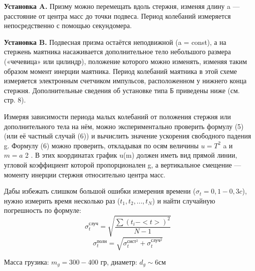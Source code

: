 \documentclass[a4paper,12pt]{article} %
\begin{document}
\textbf{Установка A.} Призму можно перемещать вдоль стержня, изменяя длину a — расстояние от центра масс до точки подвеса. Период колебаний измеряется непосредственно с помощью секундомера.

\textbf{Установка B.} Подвесная призма остаётся неподвижной (a = const), а на стержень маятника насаживается дополнительное тело небольшого размера («чечевица» или цилиндр), положение которого можно изменять, изменяя таким образом момент инерции маятника. Период колебаний маятника в этой схеме измеряется электронным счетчиком импульсов, расположенном у нижнего конца стержня. Дополнительные сведения об установке типа Б приведены ниже (см. стр. 8).

Измеряя зависимости периода малых колебаний от положения стержня или дополнительного тела на нём, можно экспериментально проверить формулу (5) (или её частный случай (6)) и вычислить значение ускорения свободного падения g. Формулу (6) можно проверить, откладывая по осям
величины $u = T^2$ a и $m = a$ 2 . В этих координатах график u(m) должен
иметь вид прямой линии, угловой коэффициент которой пропорционален g, а вертикальное смещение — моменту инерции стержня относительно центра масс.

Дабы избежать слишком большой ошибки измерения времени ($\sigma_t = 0,1-0,3 c$), нужно измерить время несколько раз ({$t_1, t_2, ..., t_N$}) и найти случайную погрешность по формуле:
\[\sigma^{\text{случ}}_t = \sqrt{\frac{\sum{(t_i - <t>)^2}}{N-1}}\]
\[\sigma^{\text{полн}}_t = \sqrt{\sigma^{\text{сист}^2}_t + \sigma^{\text{случ}^2}_t}\]

Масса грузика: $m_g = 300 - 400$ гр, диаметр: $d_g \sim 6$см
\end{document}
